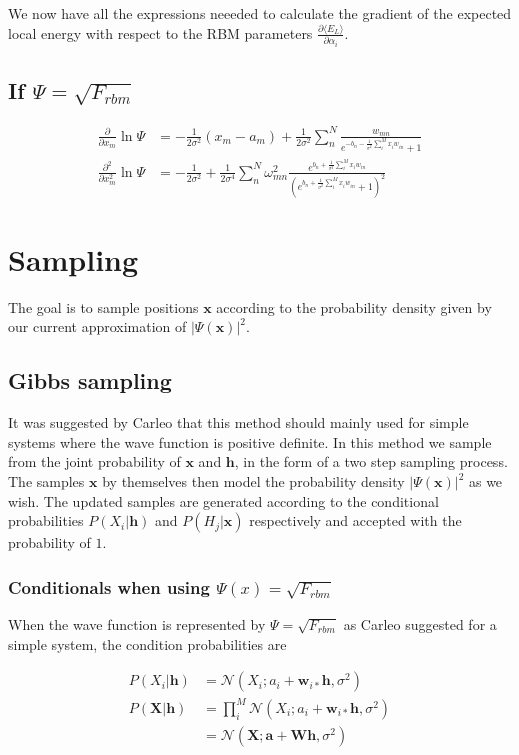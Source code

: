 \documentclass[norsk,a4paper,11pt]{article}
\newcommand{\Vx}{\mathbf{x}}
\newcommand{\Vh}{\mathbf{h}}
\begin{document}
We now have all the expressions neeeded to calculate the gradient of the expected local energy with respect to the RBM parameters $\frac{\partial \langle E_L \rangle}{\partial \alpha_i}$.

\subsection{If $\Psi = \sqrt{F_{rbm}}$}
\begin{align}
	\frac{\partial}{\partial x_m} \ln\Psi
	&= - \frac{1}{2\sigma^2}(x_m - a_m) + \frac{1}{2\sigma^2} \sum_n^N
 	\frac{w_{mn}}{e^{-b_n-\frac{1}{\sigma^2}\sum_i^M x_i w_{in}} + 1}
	\\
	\frac{\partial^2}{\partial x_m^2} \ln\Psi
	&= - \frac{1}{2\sigma^2} + \frac{1}{2\sigma^4}\sum_n^N \omega_{mn}^2 \frac{e^{b_n + \frac{1}{\sigma^2}\sum_i^M x_i w_{in}}}{(e^{b_n + \frac{1}{\sigma^2}\sum_i^M x_i w_{in}} + 1)^2}
\end{align}


\section{Sampling}
The goal is to sample positions $\Vx$ according to the probability density given by our current approximation of $|\Psi(\Vx)|^2$. 

\subsection{Gibbs sampling}
It was suggested by Carleo that this method should mainly used for simple systems where the wave function is positive definite.
In this method we sample from the joint probability of $\Vx$ and $\Vh$, in the form of a two step sampling process. The samples $\Vx$ by themselves then model the probability density $|\Psi(\Vx)|^2$ as we wish.
The updated samples are generated according to the conditional probabilities $P(X_i|\Vh)$ and $P(H_j|\Vx)$ respectively and accepted with the probability of $1$. 

\subsubsection{Conditionals when using $\Psi(x) = \sqrt{F_{rbm}}$}
When the wave function is represented by $\Psi = \sqrt{F_{rbm}}$ as Carleo suggested for a simple system, the condition probabilities are

\begin{align}
	P(X_i|\mathbf{h}) &= \mathcal{N}(X_i; a_i+\mathbf{w}_{i*} \mathbf{h}, \sigma^2) \\
	P(\mathbf{X}|\mathbf{h}) &= \prod_i^M \mathcal{N}(X_i; a_i+\mathbf{w}_{i*} \mathbf{h}, \sigma^2) \\
	&= \mathcal{N} (\mathbf{X}; \mathbf{a}+\mathbf{W}\mathbf{h},\sigma^2)
\end{align}
\end{document}
